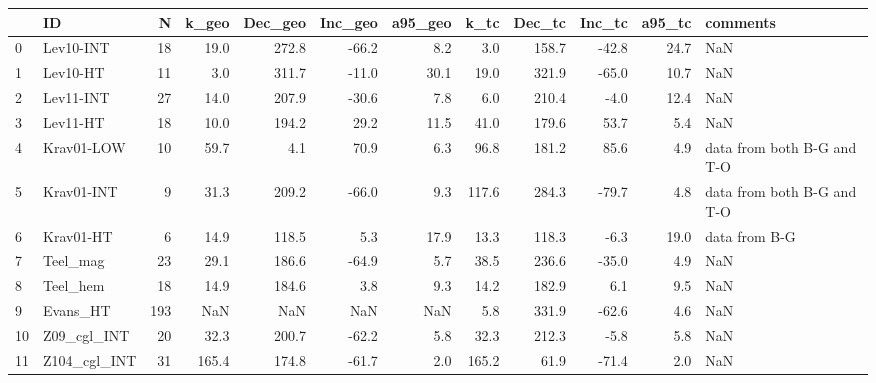 \documentclass[11pt]{article}
\begin{document}
    {\tiny\begin{tabular}{llrrrrrrrrrl}
\toprule
{} &            ID &    N &  k\_geo &  Dec\_geo &  Inc\_geo &  a95\_geo &   k\_tc &  Dec\_tc &  Inc\_tc &  a95\_tc &                    comments \\
\midrule
0  &     Lev10-INT &   18 &   19.0 &    272.8 &    -66.2 &      8.2 &    3.0 &   158.7 &   -42.8 &    24.7 &                         NaN \\
1  &      Lev10-HT &   11 &    3.0 &    311.7 &    -11.0 &     30.1 &   19.0 &   321.9 &   -65.0 &    10.7 &                         NaN \\
2  &     Lev11-INT &   27 &   14.0 &    207.9 &    -30.6 &      7.8 &    6.0 &   210.4 &    -4.0 &    12.4 &                         NaN \\
3  &      Lev11-HT &   18 &   10.0 &    194.2 &     29.2 &     11.5 &   41.0 &   179.6 &    53.7 &     5.4 &                         NaN \\
4  &    Krav01-LOW &   10 &   59.7 &      4.1 &     70.9 &      6.3 &   96.8 &   181.2 &    85.6 &     4.9 &  data from both B-G and T-O \\
5  &    Krav01-INT &    9 &   31.3 &    209.2 &    -66.0 &      9.3 &  117.6 &   284.3 &   -79.7 &     4.8 &  data from both B-G and T-O \\
6  &     Krav01-HT &    6 &   14.9 &    118.5 &      5.3 &     17.9 &   13.3 &   118.3 &    -6.3 &    19.0 &               data from B-G \\
7  &      Teel\_mag &   23 &   29.1 &    186.6 &    -64.9 &      5.7 &   38.5 &   236.6 &   -35.0 &     4.9 &                         NaN \\
8  &      Teel\_hem &   18 &   14.9 &    184.6 &      3.8 &      9.3 &   14.2 &   182.9 &     6.1 &     9.5 &                         NaN \\
9  &      Evans\_HT &  193 &    NaN &      NaN &      NaN &      NaN &    5.8 &   331.9 &   -62.6 &     4.6 &                         NaN \\
10 &   Z09\_cgl\_INT &   20 &   32.3 &    200.7 &    -62.2 &      5.8 &   32.3 &   212.3 &    -5.8 &     5.8 &                         NaN \\
11 &  Z104\_cgl\_INT &   31 &  165.4 &    174.8 &    -61.7 &      2.0 &  165.2 &    61.9 &   -71.4 &     2.0 &                         NaN \\
\bottomrule
\end{tabular}}

    
\end{document}

